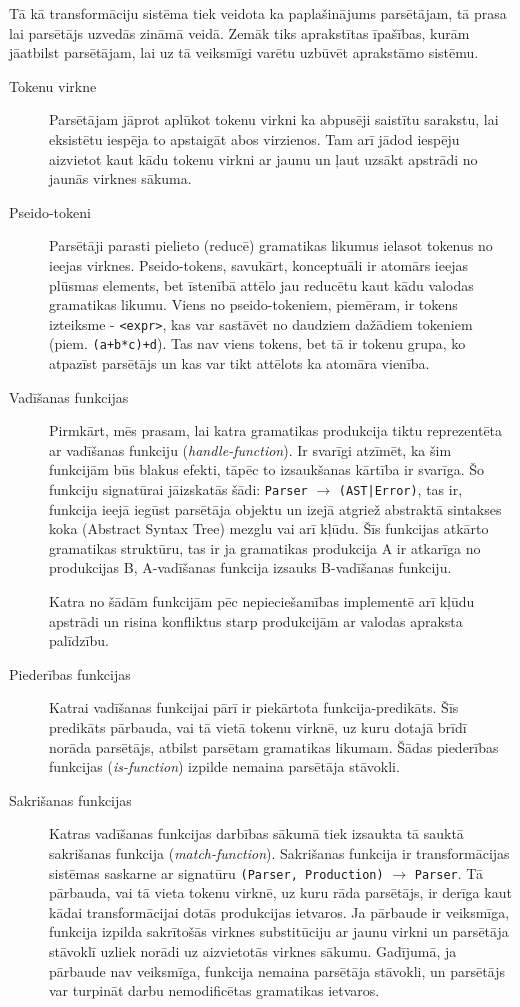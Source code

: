Tā kā transformāciju sistēma tiek veidota ka paplašinājums parsētājam, tā prasa lai parsētājs uzvedās zināmā veidā. Zemāk tiks aprakstītas īpašības, kurām jāatbilst parsētājam, lai uz tā veiksmīgi varētu uzbūvēt aprakstāmo sistēmu.
\begin{description}
\item[Tokenu virkne]
Parsētājam jāprot aplūkot tokenu virkni ka abpusēji saistītu sarakstu, lai eksistētu iespēja to apstaigāt abos virzienos. Tam arī jādod iespēju aizvietot kaut kādu tokenu virkni ar jaunu un ļaut uzsākt apstrādi no jaunās virknes sākuma.
\item[Pseido-tokeni]
Parsētāji parasti pielieto (reducē) gramatikas likumus ielasot tokenus no ieejas virknes. Pseido-tokens, savukārt, konceptuāli ir atomārs ieejas plūsmas elements, bet īstenībā attēlo jau reducētu kaut kādu valodas gramatikas likumu. Viens no pseido-tokeniem, piemēram, ir tokens izteiksme - \verb|<expr>|, kas var sastāvēt no daudziem dažādiem tokeniem (piem. \verb|(a+b*c)+d|). Tas nav viens tokens, bet tā ir tokenu grupa, ko atpazīst parsētājs un kas var tikt attēlots ka atomāra vienība.
\item[Vadīšanas funkcijas]
Pirmkārt, mēs prasam, lai katra gramatikas produkcija tiktu reprezentēta ar vadīšanas funkciju (\emph{handle-function}). Ir svarīgi atzīmēt, ka šim funkcijām būs blakus efekti, tāpēc to izsaukšanas kārtība ir svarīga. Šo funkciju signatūrai jāizskatās šādi: \verb|Parser| $\to$ \verb/(AST|Error)/, tas ir, funkcija ieejā iegūst parsētāja objektu un izejā atgriež abstraktā sintakses koka (Abstract Syntax Tree) mezglu vai arī kļūdu. Šīs funkcijas atkārto gramatikas struktūru, tas ir ja gramatikas produkcija A ir atkarīga no produkcijas B, A-vadīšanas funkcija izsauks B-vadīšanas funkciju. 

Katra no šādām funkcijām pēc nepieciešamības implementē arī kļūdu apstrādi un risina konfliktus starp produkcijām ar valodas apraksta palīdzību.
\item[Piederības funkcijas]
Katrai vadīšanas funkcijai pārī ir piekārtota funkcija-predikāts. Šīs predikāts pārbauda, vai tā vietā tokenu virknē, uz kuru dotajā brīdī norāda parsētājs, atbilst parsētam gramatikas likumam. Šādas piederības funkcijas (\emph{is-function}) izpilde nemaina parsētāja stāvokli. 

\item[Sakrišanas funkcijas]
Katras vadīšanas funkcijas darbības sākumā tiek izsaukta tā sauktā sakrišanas funkcija (\emph{match-function}). Sakrišanas funkcija ir transformācijas sistēmas saskarne ar signatūru \verb|(Parser, Production)| $\to$ \verb|Parser|. Tā pārbauda, vai tā vieta tokenu virknē, uz kuru rāda parsētājs, ir derīga kaut kādai transformācijai dotās produkcijas ietvaros. Ja pārbaude ir veiksmīga, funkcija izpilda sakrītošās virknes substitūciju ar jaunu virkni un parsētāja stāvoklī uzliek norādi uz aizvietotās virknes sākumu. Gadījumā,  ja pārbaude nav veiksmīga, funkcija nemaina parsētāja stāvokli, un parsētājs var turpināt darbu nemodificētas gramatikas ietvaros.
\end{description}

